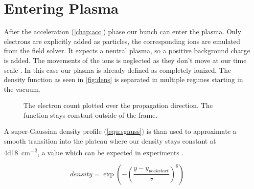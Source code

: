 \documentclass[bachelor_thesis]{subfiles}
\begin{document}
\section{Entering Plasma}\label{chap:plasma}
 After the acceleration (\autoref{chap:acc}) phase our bunch can enter the plasma.
Only electrons are explicitly added as particles, the corresponding ions are emulated from the field solver. It expects a neutral plasma, so a positive background charge is added. 
The movements of the ions is neglected as they don't move at our time scale . In this case our plasma is already defined as completely ionized.
The density function as seen in \autoref{fig:dens} is separated in multiple regimes starting in the vacuum. 

\begin{figure}
	\missingfigure{}
	\caption{The electron count plotted over the propagation direction. The function stays constant outside of the frame.}
	\label{fig:dens}
\end{figure}

A super-Gaussian density profile (\autoref{equ:sgauss}) is than used to approximate a smooth transition into the plateau where our density stays constant at \qty{4d18}{\cm^{-3}}, a value which can be expected in experiments \cite{Schoebel2022, Kurz2021}. 

\begin{equation}
	density = \exp\left(-\left(\frac{y-y_{peak start}}{\sigma}\right)^6\right)
	\label{equ:sgauss}
\end{equation}
\end{document}
